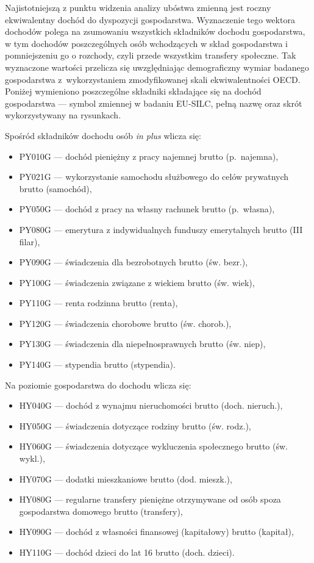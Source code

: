 Najistotniejszą z punktu widzenia analizy ubóstwa zmienną jest roczny ekwiwalentny dochód do dyspozycji gospodarstwa. Wyznaczenie tego wektora dochodów polega na zsumowaniu wszystkich składników dochodu gospodarstwa, w tym dochodów poszczególnych osób wchodzących w skład gospodarstwa i pomniejszeniu go o rozchody, czyli przede wszystkim transfery społeczne. Tak wyznaczone wartości przelicza się uwzględniając demograficzny wymiar badanego gospodarstwa z~wykorzystaniem zmodyfikowanej skali ekwiwalentności OECD. Poniżej wymieniono poszczególne składniki składające się na dochód gospodarstwa --- symbol zmiennej w badaniu EU-SILC, pełną nazwę oraz skrót wykorzystywany na rysunkach.

Spośród składników dochodu osób \emph{in plus} wlicza się:

\begin{itemize}
\item PY010G --- dochód pieniężny z pracy najemnej brutto (p.~najemna),
\item PY021G --- wykorzystanie samochodu służbowego do celów prywatnych brutto (samochód),
\item PY050G --- dochód z pracy na własny rachunek brutto (p.~własna),
\item PY080G --- emerytura z indywidualnych funduszy emerytalnych brutto (III filar),
\item PY090G --- świadczenia dla bezrobotnych brutto (św. bezr.),
\item PY100G --- świadczenia związane z wiekiem brutto (św. wiek),
\item PY110G --- renta rodzinna brutto (renta),
\item PY120G --- świadczenia chorobowe brutto (św. chorob.),
\item PY130G --- świadczenia dla niepełnosprawnych brutto (św. niep),
\item PY140G --- stypendia brutto (stypendia).
\end{itemize}

Na poziomie gospodarstwa do dochodu wlicza się:

\begin{itemize}
\item HY040G --- dochód z wynajmu nieruchomości brutto (doch. nieruch.),
\item HY050G --- świadczenia dotyczące rodziny brutto (św. rodz.),
\item HY060G --- świadczenia dotyczące wykluczenia społecznego brutto (św. wykl.),
\item HY070G --- dodatki mieszkaniowe brutto (dod. mieszk.),
\item HY080G --- regularne transfery pieniężne otrzymywane od osób spoza gospodarstwa domowego brutto (transfery),
\item HY090G --- dochód z własności finansowej (kapitałowy) brutto (kapitał),
\item HY110G --- dochód dzieci do lat 16 brutto (doch. dzieci).
\end{itemize}

